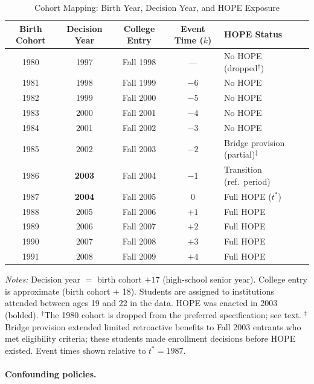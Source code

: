\begin{table}[H]
\centering
\begin{threeparttable}
\caption{Cohort Mapping: Birth Year, Decision Year, and HOPE Exposure}
\label{tab:cohort_map}
\begin{tabular}{cccclc}
\toprule
Birth Cohort & Decision Year & College Entry & Event Time ($k$) & HOPE Status \\
\midrule
1980 & 1997 & Fall 1998 & --- & No HOPE (dropped$^\dagger$) \\
1981 & 1998 & Fall 1999 & $-6$ & No HOPE \\
1982 & 1999 & Fall 2000 & $-5$ & No HOPE \\
1983 & 2000 & Fall 2001 & $-4$ & No HOPE \\
1984 & 2001 & Fall 2002 & $-3$ & No HOPE \\
1985 & 2002 & Fall 2003 & $-2$ & Bridge provision (partial)$^\ddagger$ \\
1986 & \textbf{2003} & Fall 2004 & $-1$ & Transition (ref.\ period) \\
\midrule
1987 & \textbf{2004} & Fall 2005 & $0$ & Full HOPE ($t^*$) \\
1988 & 2005 & Fall 2006 & $+1$ & Full HOPE \\
1989 & 2006 & Fall 2007 & $+2$ & Full HOPE \\
1990 & 2007 & Fall 2008 & $+3$ & Full HOPE \\
1991 & 2008 & Fall 2009 & $+4$ & Full HOPE \\
\bottomrule
\end{tabular}
\begin{tablenotes}[flushleft]
\footnotesize
\item \textit{Notes:} Decision year $=$ birth cohort $+ 17$ (high-school
  senior year). College entry is approximate (birth cohort $+$ 18).
  Students are assigned to institutions attended between ages 19 and 22
  in the \textcite{chetty2020mobility} data. HOPE was enacted in 2003
  (bolded). $^\dagger$The 1980 cohort is dropped from the preferred
  specification; see text. $^\ddagger$Bridge provision extended limited
  retroactive benefits to Fall 2003 entrants who met eligibility
  criteria; these students made enrollment decisions before HOPE existed.
  Event times shown relative to $t^* = 1987$.
\end{tablenotes}
\end{threeparttable}
\end{table}

\paragraph{Confounding policies.}

